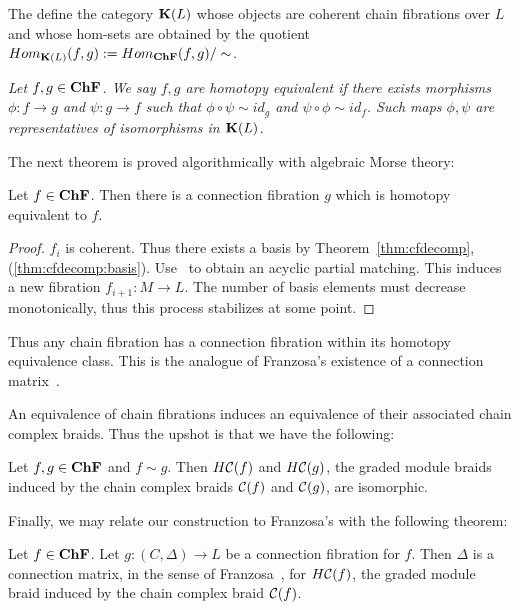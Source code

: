 The define the category ${\bf K}(L)$ whose objects are coherent chain fibrations over $L$ and whose hom-sets are obtained by the quotient $Hom_{{\bf K}(L)}(f,g) := Hom_{{\bf ChF}}(f,g)/\sim$.  %

\begin{defn}
{\em
Let $f,g\in {\bf ChF}$.  We say $f,g$ are {\em homotopy equivalent} if there exists morphisms $\phi:f\to g$ and $\psi:g\to f$ such that $\phi\circ \psi\sim id_g$ and $\psi\circ \phi \sim id_f$. Such maps $\phi,\psi$ are representatives of isomorphisms in ${\bf K}(L)$.
}
\end{defn}

The next theorem is proved algorithmically with algebraic Morse theory:


\begin{thm}\label{thm:exist}
Let $f\in {\bf ChF}$.  Then there is a connection fibration $g$ which is homotopy equivalent to $f$.
\end{thm}
\begin{proof}
$f_i$ is coherent.  Thus there exists a basis by Theorem~\ref{thm:cfdecomp}, (\ref{thm:cfdecomp:basis}).  Use~\cite[Algorithm 3.6]{focm} to obtain an acyclic partial matching.  This induces a new fibration $f_{i+1}:M\to L$.  The number of basis elements must decrease monotonically, thus this process stabilizes at some point.

\end{proof}


\begin{rem}
Thus any chain fibration has a connection fibration within its homotopy equivalence class.  This is the analogue of Franzosa's existence of a connection matrix~\cite{fran}.
\end{rem}


An equivalence of chain fibrations induces an equivalence of their associated chain complex braids.  Thus the upshot is that we have the following:

\begin{prop}
Let $f,g\in {\bf ChF}$ and $f\sim g$. Then $H{\mathcal C}(f)$ and $H{\mathcal C}(g)$, the graded module braids induced by the chain complex braids ${\mathcal C}(f)$ and ${\mathcal C}(g)$, are isomorphic.
\end{prop}

Finally, we may relate our construction to Franzosa's with the following theorem:

\begin{thm}\label{thm:cfcm}
Let $f\in {\bf ChF}$.  Let $g:(C,\Delta)\to L$ be a connection fibration for $f$.  Then $\Delta$ is a connection matrix, in the sense of Franzosa~\cite[Definition 3.6]{fran}, for $H{\mathcal C}(f)$, the graded module braid induced by the chain complex braid ${\mathcal C}(f)$.
\end{thm}




